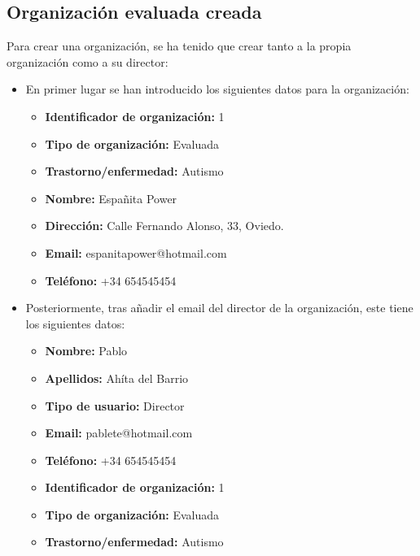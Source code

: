\subsection{Organización evaluada creada}
Para crear una organización, se ha tenido que crear tanto a la propia organización como a su director:
\begin{itemize}
    \item En primer lugar se han introducido los siguientes datos para la organización:
    \begin{itemize}
        \item \textbf{Identificador de organización: }1
        \item \textbf{Tipo de organización: }Evaluada
        \item \textbf{Trastorno/enfermedad: }Autismo
        \item \textbf{Nombre: }Españita Power
        \item \textbf{Dirección: }Calle Fernando Alonso, 33, Oviedo.
        \item \textbf{Email: }espanitapower@hotmail.com
        \item \textbf{Teléfono: }+34 654545454
    \end{itemize}
    \item Posteriormente, tras añadir el email del director de la organización, este tiene los siguientes datos:
    \begin{itemize}
        \item \textbf{Nombre: }Pablo
        \item \textbf{Apellidos: }Ahíta del Barrio
        \item \textbf{Tipo de usuario: }Director
        \item \textbf{Email: }pablete@hotmail.com
        \item \textbf{Teléfono: }+34 654545454
        \item \textbf{Identificador de organización: }1
        \item \textbf{Tipo de organización: }Evaluada
        \item \textbf{Trastorno/enfermedad: }Autismo
    \end{itemize}
\end{itemize}
